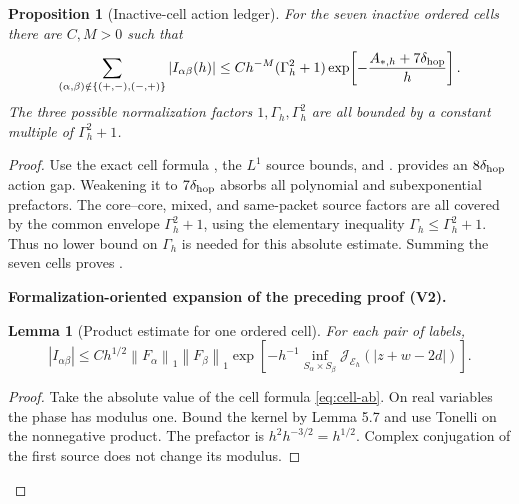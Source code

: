\documentclass[11pt]{article}
\newtheorem{proposition}[theorem]{Proposition}
\newtheorem{lemma}[theorem]{Lemma}
\newcommand{\formalisationparentid}{X}
\newenvironment{formalisationaddition}[1]{\par\medskip\begingroup\color{blue}\def\formalisationparentid{#1}\setcounter{formalizationsublemma}{0}\let\lemma\formalizationsublemma\let\endlemma\endformalizationsublemma
  \def\Eo{\mathcal E_h^\circ}\def\EE{\mathcal E_h}\def\phio{\phi_h^\circ}\def\phih{\phi_h}\def\Ho{H_h^{\rm atom}(v^\circ)}\def\Ha{H_h^{\rm atom}}\def\HL{H_h^{L}}\def\Dh{D_h}\def\Log{\operatorname{Log}}\def\ellh{\ell_h}\def\Gp{G_{p,h}}\def\Ast{A_{*,h}}\def\ahat{\widehat{\mathfrak a}_h}\def\ah{\mathfrak a_h}\def\rh{\widehat\rho_h}\def\deltah{\widehat\delta_h}\def\oldref##1{\textup{(##1)}}\def\interface##1{\par\noindent\textit{Analytical interface used here.} ##1\par}\def\finish{\par\noindent\textit{Conclusion of the formalization-oriented expansion.} }\par\noindent\textbf{Formalization-oriented expansion of the preceding proof (V2).}\par\smallskip
}{\par\endgroup\medskip
}
\newcommand{\cJ}{\mathcal J}
\newcommand{\norm}[1]{\left\|#1\right\|}
\begin{document}
\begin{proposition}[Inactive-cell action ledger]
\label{prop:inactive-cell-ledger}
For the seven inactive ordered cells there are $C,M>0$ such that
\begin{equation}\label{eq:inactive-cell-absolute}
 \sum_{(\alpha,\beta)\notin\{(+,-),(-,+)\}}
 |I_{\alpha\beta}(h)|
 \le Ch^{-M}(\Gamma_h^2+1)
 \exp\!\left[-\frac{A_{*,h}+7\delta_{\rm hop}}h\right].
\end{equation}
The three possible normalization factors $1,\Gamma_h,\Gamma_h^2$ are all bounded by a constant multiple of $\Gamma_h^2+1$.
\end{proposition}

\begin{proof}
Use the exact cell formula , the $L^1$ source bounds, and
.  
provides an $8\delta_{\rm hop}$ action gap.  Weakening it to
$7\delta_{\rm hop}$ absorbs all polynomial and subexponential prefactors.  The core--core, mixed, and same-packet source factors are all covered
by the common envelope $\Gamma_h^2+1$, using the elementary inequality
$\Gamma_h\le \Gamma_h^2+1$.  Thus no lower bound on $\Gamma_h$ is needed for
this absolute estimate.  Summing the seven cells proves
.

\begin{formalisationaddition}{P5.8}
\begin{lemma}[Product estimate for one ordered cell]\label{sublemma:P5-8-product}
For each pair of labels,
\[
 |I_{\alpha\beta}|\le Ch^{1/2}\norm{F_\alpha}_1\norm{F_\beta}_1
 \exp\!\left[-h^{-1}\inf_{S_\alpha\times S_\beta}\cJ_{\mathcal E_h}(|z+w-2d|)\right].
\]
\end{lemma}
\begin{proof}
Take the absolute value of the cell formula \eqref{eq:cell-ab}. On real variables the phase has modulus one. Bound the kernel by Lemma 5.7 and use Tonelli on the nonnegative product. The prefactor is $h^2h^{-3/2}=h^{1/2}$. Complex conjugation of the first source does not change its modulus.
\end{proof}


\end{formalisationaddition}
\end{proof}
\end{document}
